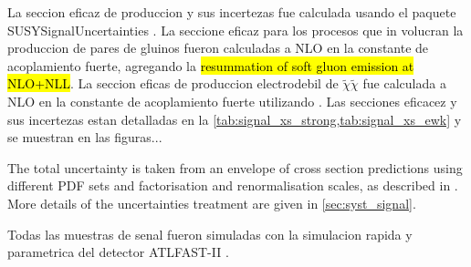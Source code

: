 La seccion eficaz de produccion y sus incertezas fue calculada usando el paquete SUSYSignalUncertainties \cite{SUSYsigunc}.
La seccione eficaz para los procesos que in volucran la produccion de pares de gluinos fueron calculadas a NLO
en la constante de acoplamiento fuerte, agregando la \hl{resummation of soft gluon emission at NLO+NLL}\cite{Beenakker:1996ch,Kulesza:2008jb,Kulesza:2009kq,Beenakker:2009ha,Beenakker:2011fu}.
La seccion eficas de produccion electrodebil de $\tilde{\chi}\tilde{\chi}$ fue calculada
a NLO en la constante de acoplamiento fuerte utilizando {\prospino} \cite{Beenakker:1999xh}.
Las secciones eficacez y sus incertezas estan detalladas en la \cref{tab:signal_xs_strong,tab:signal_xs_ewk}
y se muestran en las figuras...

The total uncertainty is taken from an envelope of cross section predictions using different PDF
sets and factorisation and renormalisation scales, as described in \cite{Kramer:2012bx}.
More details of the uncertainties treatment are given in {\Sec} \ref{sec:syst_signal}. %


Todas las muestras de senal fueron simuladas con la simulacion rapida y parametrica del detector ATLFAST-II \cite{Richter-Was:683751}.



